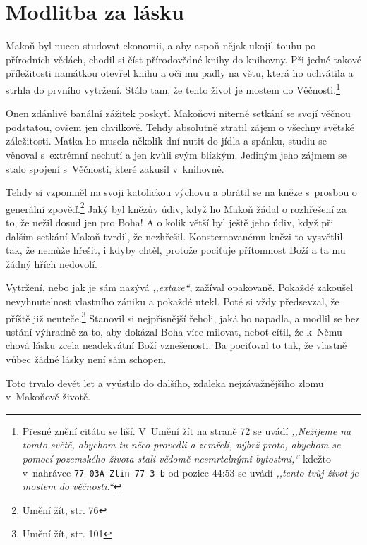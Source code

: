 \section{Modlitba za lásku}

Makoň byl nucen studovat ekonomii, a aby aspoň nějak ukojil touhu po přírodních
vědách, chodil si číst přírodovědné knihy do knihovny. Při jedné takové
příležitosti namátkou otevřel knihu a oči mu padly na větu, která ho uchvátila a
strhla do prvního vytržení. Stálo tam, že tento život je mostem do
Věčnosti.\footnote{Přesné znění citátu se liší. V~Umění žít na straně 72 se
uvádí \textit{,,Nežijeme na tomto světě, abychom tu něco provedli a zemřeli,
nýbrž proto, abychom se pomocí pozemského života stali vědomě nesmrtelnými
bytostmi,``} kdežto v~nahrávce \texttt{77-03A-Zlin-77-3-b} od pozice 44:53 se
uvádí \textit{,,tento tvůj život je mostem do věčnosti.``}}

Onen zdánlivě banální zážitek poskytl Makoňovi niterné setkání se svojí věčnou
podstatou, ovšem jen chvilkově. Tehdy absolutně ztratil zájem o všechny světské
záležitosti. Matka ho musela několik dní nutit do jídla a spánku, studiu se
věnoval s~extrémní nechutí a jen kvůli svým blízkým. Jediným jeho zájmem se
stalo spojení s~Věčností, které zakusil v~knihovně.

Tehdy si vzpomněl na svoji katolickou výchovu a obrátil se na kněze s~prosbou o
generální zpověď.\footnote{Umění žít, str. 76} Jaký byl knězův údiv, když ho Makoň žádal o rozhřešení za to,
že nežil dosud jen pro Boha! A o kolik větší byl ještě jeho údiv, když při
dalším setkání Makoň tvrdil, že nezhřešil. Konsternovanému knězi to vysvětlil
tak, že nemůže hřešit, i kdyby chtěl, protože pociťuje přítomnost Boží a ta mu
žádný hřích nedovolí.

Vytržení, nebo jak je sám nazývá \textit{,,extaze``}, zažíval opakovaně. Pokaždé
zakoušel nevyhnutelnost vlastního zániku a pokaždé utekl. Poté si vždy
předsevzal, že příště již neuteče.\footnote{Umění žít, str. 101} Stanovil si nejpřísnější řeholi, jaká ho
napadla, a modlil se bez ustání výhradně za to, aby dokázal Boha více milovat,
neboť cítil, že k~Němu chová lásku zcela neadekvátní Boží vznešenosti. Ba
pociťoval to tak, že vlastně vůbec žádné lásky není sám
schopen.

Toto trvalo devět let a vyústilo do dalšího, zdaleka nejzávažnějšího zlomu
v~Makoňově životě.


